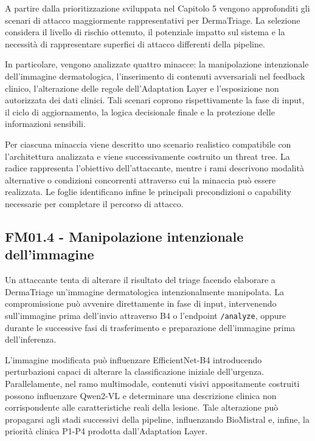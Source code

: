 
A partire dalla prioritizzazione sviluppata nel Capitolo 5 vengono approfonditi gli scenari di attacco maggiormente rappresentativi per DermaTriage. La selezione considera il livello di rischio ottenuto, il potenziale impatto sul sistema e la necessità di rappresentare superfici di attacco differenti della pipeline.

In particolare, vengono analizzate quattro minacce: la manipolazione intenzionale dell'immagine dermatologica, l'inserimento di contenuti avversariali nel feedback clinico, l'alterazione delle regole dell'Adaptation Layer e l'esposizione non autorizzata dei dati clinici. Tali scenari coprono rispettivamente la fase di input, il ciclo di aggiornamento, la logica decisionale finale e la protezione
delle informazioni sensibili.

Per ciascuna minaccia viene descritto uno scenario realistico compatibile con l'architettura analizzata e viene successivamente costruito un threat tree. La radice rappresenta l'obiettivo dell'attaccante, mentre i rami descrivono modalità alternative o condizioni concorrenti attraverso cui la minaccia può essere realizzata. Le foglie identificano infine le principali precondizioni o capability necessarie per completare il percorso di attacco.

\subsection{FM01.4 - Manipolazione intenzionale dell'immagine}
Un attaccante tenta di alterare il risultato del triage facendo elaborare a DermaTriage un'immagine dermatologica intenzionalmente manipolata. La compromissione può avvenire direttamente in fase di input, intervenendo sull'immagine prima dell'invio attraverso B4 o l'endpoint \texttt{/analyze}, oppure durante le successive fasi di trasferimento e preparazione dell'immagine prima dell'inferenza.

L'immagine modificata può influenzare EfficientNet-B4 introducendo perturbazioni capaci di alterare la classificazione iniziale dell'urgenza. Parallelamente, nel ramo multimodale, contenuti visivi appositamente costruiti possono influenzare Qwen2-VL e determinare una descrizione clinica non corrispondente alle caratteristiche reali della lesione. Tale alterazione può propagarsi agli stadi successivi della pipeline, influenzando BioMistral e, infine, la priorità clinica P1-P4 prodotta dall'Adaptation Layer.

